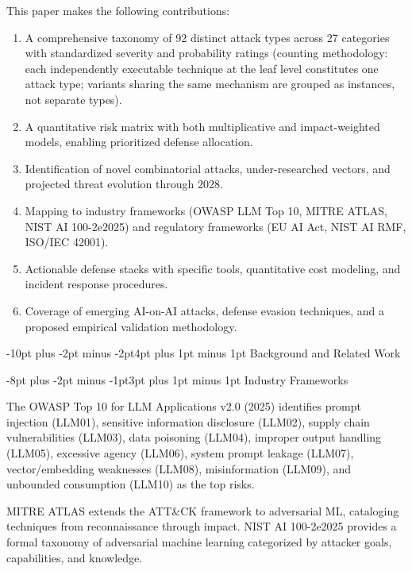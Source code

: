 \documentclass[conference]{IEEEtran}
\makeatletter
\renewcommand{\section}{\@startsection{section}{1}{\z@}%
  {-10pt plus -2pt minus -2pt}{4pt plus 1pt minus 1pt}%
  {\normalfont\large\bfseries\sffamily\color{accentdark}}}
\renewcommand{\subsection}{\@startsection{subsection}{2}{\z@}%
  {-8pt plus -2pt minus -1pt}{3pt plus 1pt minus 1pt}%
  {\normalfont\normalsize\bfseries\sffamily\color{accentblue}}}
\makeatother
\begin{document}
This paper makes the following contributions:
\begin{enumerate}[leftmargin=*]
    \item A comprehensive taxonomy of 92 distinct attack types across 27 categories with standardized severity and probability ratings (counting methodology: each independently executable technique at the leaf level constitutes one attack type; variants sharing the same mechanism are grouped as instances, not separate types).
    \item A quantitative risk matrix with both multiplicative and impact-weighted models, enabling prioritized defense allocation.
    \item Identification of novel combinatorial attacks, under-researched vectors, and projected threat evolution through 2028.
    \item Mapping to industry frameworks (OWASP LLM Top 10, MITRE ATLAS, NIST AI 100-2e2025) and regulatory frameworks (EU AI Act, NIST AI RMF, ISO/IEC 42001).
    \item Actionable defense stacks with specific tools, quantitative cost modeling, and incident response procedures.
    \item Coverage of emerging AI-on-AI attacks, defense evasion techniques, and a proposed empirical validation methodology.
\end{enumerate}


\section{Background and Related Work}


\subsection{Industry Frameworks}

The OWASP Top 10 for LLM Applications v2.0 (2025) \cite{owasp2025} identifies prompt injection (LLM01), sensitive information disclosure (LLM02), supply chain vulnerabilities (LLM03), data poisoning (LLM04), improper output handling (LLM05), excessive agency (LLM06), system prompt leakage (LLM07), vector/embedding weaknesses (LLM08), misinformation (LLM09), and unbounded consumption (LLM10) as the top risks.

MITRE ATLAS \cite{mitre_atlas} extends the ATT\&CK framework to adversarial ML, cataloging techniques from reconnaissance through impact. NIST AI 100-2e2025 \cite{nist2025} provides a formal taxonomy of adversarial machine learning categorized by attacker goals, capabilities, and knowledge.
\end{document}
